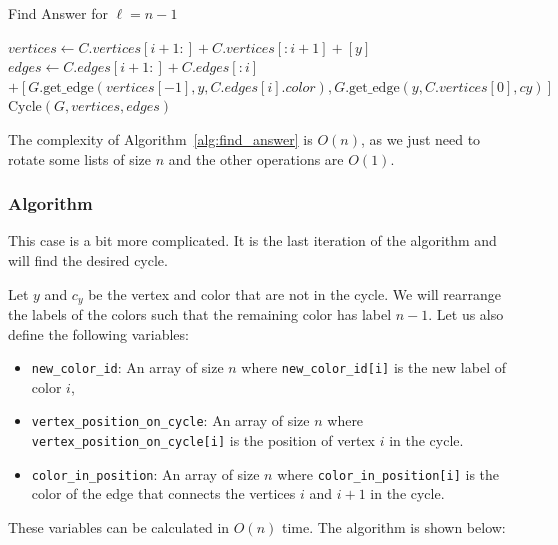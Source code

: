 \begin{itemize}
    \begin{algorithm}
        \caption{Find Answer for \( \ell = n - 1 \)}
        \label{alg:find_answer}
        \begin{algorithmic}[1]
                \State $vertices \gets C.vertices[i + 1:] + C.vertices[:i + 1] + [y]$
                \State $edges \gets C.edges[i + 1:] + C.edges[:i]$
                \State \hspace{2.5em} $+ [G.\text{get\_edge}(vertices[-1], y, C.edges[i].color), G.\text{get\_edge}(y, C.vertices[0], cy)]$
                \State \Return $\text{Cycle}(G, vertices, edges)$
            \EndFunction
        \end{algorithmic}
    \end{algorithm}

    The complexity of Algorithm~\ref{alg:find_answer} is $O(n)$, as we just need to rotate some lists of size $n$ and the other operations are $O(1)$.
\end{itemize}

\subsubsection{Algorithm}

This case is a bit more complicated. It is the last iteration of the algorithm and will
find the desired cycle.

Let $y$ and $c_y$ be the vertex and color that are not in the cycle. We will rearrange the labels
of the colors such that the remaining color has label $n - 1$. Let us also define the following variables:

\begin{itemize}
    \item \texttt{new\_color\_id}: An array of size \( n \) where \texttt{new\_color\_id[i]} is the new label of color \( i \),
    \item \texttt{vertex\_position\_on\_cycle}: An array of size \( n \) where \texttt{vertex\_position\_on\_cycle[i]} is the position of vertex \( i \) in the cycle.
    \item \texttt{color\_in\_position}: An array of size \( n \) where \texttt{color\_in\_position[i]} is the color of the edge that connects the vertices \( i \) and \( i + 1 \) in the cycle.
\end{itemize}

These variables can be calculated in \( O(n) \) time. The algorithm is shown below:

